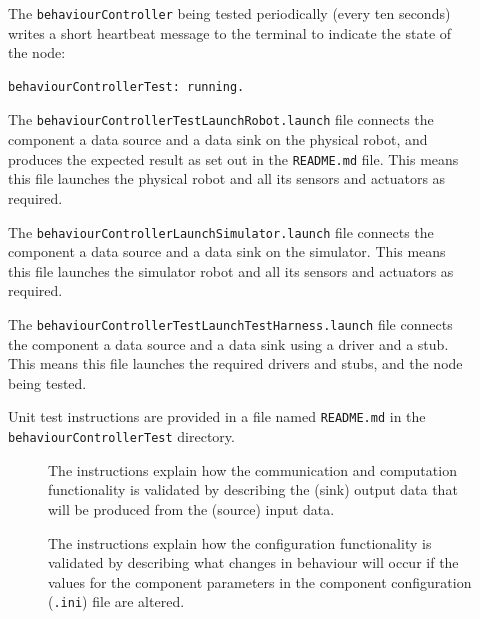 \documentclass{CSSRforAfrica}
\newcommand{\checkboxChecked}{\fbox{\ding{51}}} %
\newcommand{\checkboxDashed}{\fbox{--}}         %
\begin{document}
\begin{description}
\item[\checkboxDashed]  The {\small \verb+behaviourController+} being tested periodically (every ten seconds) writes a short heartbeat message to
 the terminal to indicate the state of the node:
\begin{verbatim}
behaviourControllerTest: running.
\end{verbatim}

\item[\checkboxChecked] The {\small \verb+behaviourControllerTestLaunchRobot.launch+} file  connects the component a data source and a data sink on the physical robot, and produces the expected result as set out in the  {\small \verb+README.md+}  file.    This means this file launches the physical robot and all its sensors and actuators as required.

\item[\checkboxDashed] The {\small \verb+behaviourControllerLaunchSimulator.launch+} file  connects the component a data source and a data sink on the simulator.   This means this file launches the simulator robot and all its sensors and actuators as required.

\item[\checkboxChecked] The {\small \verb+behaviourControllerTestLaunchTestHarness.launch+} file  connects the component a data source and a data sink using a driver and a stub.   This means this file launches the required drivers and stubs, and the node being tested.

\item[\checkboxChecked] Unit test instructions are provided in a file named {\small \verb+README.md+} in the  {\small \verb+behaviourControllerTest+} directory. 


\begin{description}

\item[\checkboxChecked] The instructions explain how the communication and computation functionality is validated by describing the (sink) output data that will be produced from the (source) input data.  

\item[\checkboxChecked] The instructions explain how the configuration functionality is validated by describing what changes in behaviour will occur if the values for the component parameters in the component configuration ({\small \verb+.ini+}) file are altered.

\end{description}
\end{description}
\newpage
\end{document}
